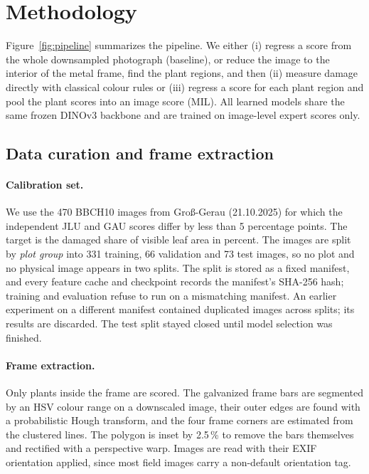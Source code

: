 \section{Methodology}
\label{sec:method}



Figure~\ref{fig:pipeline} summarizes the pipeline. We either (i) regress a score from the whole
downsampled photograph (baseline), or reduce the image to the interior of the metal frame, find the
plant regions, and then (ii) measure damage directly with classical colour rules or (iii) regress a
score for each plant region and pool the plant scores into an image score (MIL). All learned
models share the same frozen DINOv3 backbone and are trained on image-level expert scores only.

\subsection{Data curation and frame extraction}
\label{sec:data}

\paragraph{Calibration set.} We use the 470 BBCH10 images from Gro\ss-Gerau (21.10.2025) for
which the independent JLU and GAU scores differ by less than 5 percentage points. The target is
the damaged share of visible leaf area in percent. The images are split by \emph{plot group} into
331 training, 66 validation and 73 test images, so no plot and no physical image appears in two
splits. The split is stored as a fixed manifest, and every feature cache and checkpoint records the
manifest's SHA-256 hash; training and evaluation refuse to run on a mismatching manifest. An
earlier experiment on a different manifest contained duplicated images across splits; its results
are discarded. The test split stayed closed until model selection was finished.

\paragraph{Frame extraction.} Only plants inside the frame are scored. The galvanized frame bars
are segmented by an HSV colour range on a downscaled image, their outer edges are found with a
probabilistic Hough transform, and the four frame corners are estimated from the clustered lines.
The polygon is inset by 2.5\,\% to remove the bars themselves and rectified with a perspective
warp. Images are read with their EXIF orientation applied, since most field images carry a
non-default orientation tag.

